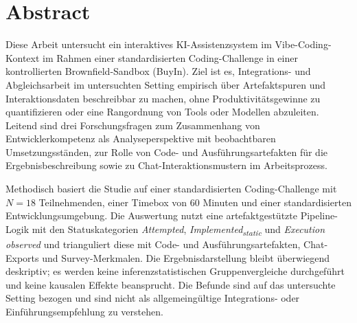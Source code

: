 \chapter*{Abstract}

Diese Arbeit untersucht ein interaktives KI-Assistenzsystem im Vibe-Coding-Kontext im Rahmen einer standardisierten Coding-Challenge in einer kontrollierten Brownfield-Sandbox (BuyIn). Ziel ist es, Integrations- und Abgleichsarbeit im untersuchten Setting empirisch über Artefaktspuren und Interaktionsdaten beschreibbar zu machen, ohne Produktivitätsgewinne zu quantifizieren oder eine Rangordnung von Tools oder Modellen abzuleiten. Leitend sind drei Forschungsfragen zum Zusammenhang von Entwicklerkompetenz als Analyseperspektive mit beobachtbaren Umsetzungsständen, zur Rolle von Code- und Ausführungsartefakten für die Ergebnisbeschreibung sowie zu Chat-Interaktionsmustern im Arbeitsprozess.

Methodisch basiert die Studie auf einer standardisierten Coding-Challenge mit $N = 18$ Teilnehmenden, einer Timebox von 60 Minuten und einer standardisierten Entwicklungsumgebung. Die Auswertung nutzt eine artefaktgestützte Pipeline-Logik mit den Statuskategorien \textit{Attempted}, \textit{Implemented\textsubscript{static}} und \textit{Execution observed} und trianguliert diese mit Code- und Ausführungsartefakten, Chat-Exports und Survey-Merkmalen. Die Ergebnisdarstellung bleibt überwiegend deskriptiv; es werden keine inferenzstatistischen Gruppenvergleiche durchgeführt und keine kausalen Effekte beansprucht. Die Befunde sind auf das untersuchte Setting bezogen und sind nicht als allgemeingültige Integrations- oder Einführungsempfehlung zu verstehen.
